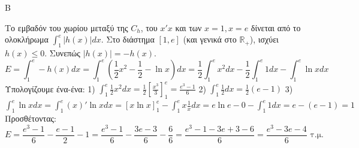 \begin{thema}{Β}
\begin{erwthma}
\item Το εμβαδόν του χωρίου μεταξύ της $C_h$, του $x'x$ και των $x=1, x=e$ δίνεται από το ολοκλήρωμα $\int_1^e |h(x)|dx$.
Στο διάστημα $[1, e]$ (και γενικά στο $\mathbb{R}_+$), ισχύει $h(x) \le 0$. Συνεπώς $|h(x)| = -h(x)$.
\[ E = \int_1^e -h(x) dx = \int_1^e \left( \frac{1}{2}x^2 - \frac{1}{2} - \ln x \right) dx = \frac{1}{2}\int_1^e x^2 dx - \frac{1}{2}\int_1^e 1 dx - \int_1^e \ln x dx \]
Υπολογίζουμε ένα-ένα:
1) $\int_1^e \frac{1}{2}x^2 dx = \frac{1}{2} \left[ \frac{x^3}{3} \right]_1^e = \frac{e^3-1}{6}$
2) $\int_1^e \frac{1}{2} dx = \frac{1}{2} (e-1)$
3) $\int_1^e \ln x dx = \int_1^e (x)' \ln x dx = [x \ln x]_1^e - \int_1^e x \frac{1}{x} dx = e \ln e - 0 - \int_1^e 1 dx = e - (e-1) = 1$
Προσθέτοντας:
\[ E = \frac{e^3-1}{6} - \frac{e-1}{2} - 1 = \frac{e^3-1}{6} - \frac{3e-3}{6} - \frac{6}{6} = \frac{e^3 - 1 - 3e + 3 - 6}{6} = \frac{e^3 - 3e - 4}{6} \text{ τ.μ.} \]
\end{erwthma}
\end{thema}

